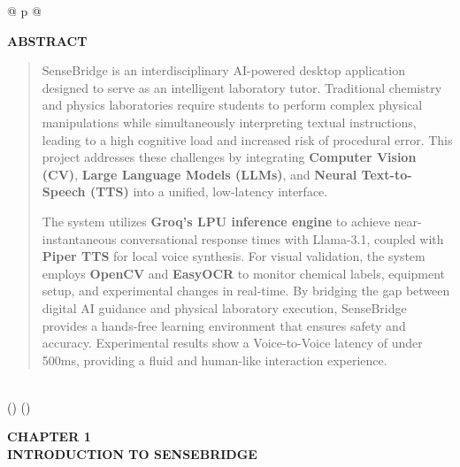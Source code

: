 \documentclass[]{article}
\begin{document}
\begin{longtable}[]{@{} p{\textwidth} @{}}
\begin{minipage}[b]{\linewidth}\raggedright
\textbf{ABSTRACT}

\begin{quote}
SenseBridge is an interdisciplinary AI-powered desktop application designed to serve as an intelligent laboratory tutor. Traditional chemistry and physics laboratories require students to perform complex physical manipulations while simultaneously interpreting textual instructions, leading to a high cognitive load and increased risk of procedural error. This project addresses these challenges by integrating \textbf{Computer Vision (CV)}, \textbf{Large Language Models (LLMs)}, and \textbf{Neural Text-to-Speech (TTS)} into a unified, low-latency interface.

The system utilizes \textbf{Groq's LPU inference engine} to achieve near-instantaneous conversational response times with Llama-3.1, coupled with \textbf{Piper TTS} for local voice synthesis. For visual validation, the system employs \textbf{OpenCV} and \textbf{EasyOCR} to monitor chemical labels, equipment setup, and experimental changes in real-time. By bridging the gap between digital AI guidance and physical laboratory execution, SenseBridge provides a hands-free learning environment that ensures safety and accuracy. Experimental results show a Voice-to-Voice latency of under 500ms, providing a fluid and human-like interaction experience.
\end{quote}
\end{minipage} \\
\midrule()
\endhead
\bottomrule()
\end{longtable}

\newpage

\textbf{CHAPTER 1} \\
\textbf{INTRODUCTION TO SENSEBRIDGE}
\end{document}
